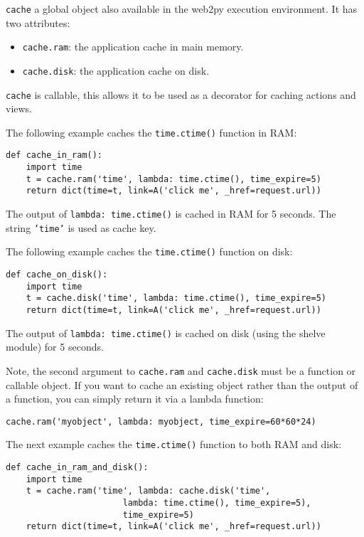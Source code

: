 \documentclass[justified,sixbynine,notoc]{tufte-book}
\def\ft{\small\tt}
\def\inxx#1{\index{#1}}
\begin{document}
\begin{fullwidth}
\inxx{cache} \inxx{cache.ram} \inxx{cache.disk}
{\ft cache} a global object also available in the web2py execution environment. It has two attributes:
\begin{itemize}
\item {\ft cache.ram}: the application cache in main memory.

\item {\ft cache.disk}: the application cache on disk.
\end{itemize}
{\ft cache} is callable, this allows it to be used as a decorator for caching actions and views.

The following example caches the {\ft time.ctime()} function in RAM:
\begin{lstlisting}
def cache_in_ram():
    import time
    t = cache.ram('time', lambda: time.ctime(), time_expire=5)
    return dict(time=t, link=A('click me', _href=request.url))
\end{lstlisting}

The output of {\ft lambda: time.ctime()} is cached in RAM for 5 seconds. The string {\ft 'time'} is used as cache key.

The following example caches the {\ft time.ctime()} function on disk:
\begin{lstlisting}
def cache_on_disk():
    import time
    t = cache.disk('time', lambda: time.ctime(), time_expire=5)
    return dict(time=t, link=A('click me', _href=request.url))
\end{lstlisting}

The output of {\ft lambda: time.ctime()} is cached on disk (using the shelve module) for 5 seconds.

Note, the second argument to {\ft cache.ram} and {\ft cache.disk} must be a function or callable object. If you want to cache an existing object rather than the output of a function, you can simply return it via a lambda function:
\begin{lstlisting}
cache.ram('myobject', lambda: myobject, time_expire=60*60*24)
\end{lstlisting}

The next example caches the {\ft time.ctime()} function to both RAM and disk:
\begin{lstlisting}
def cache_in_ram_and_disk():
    import time
    t = cache.ram('time', lambda: cache.disk('time',
                       lambda: time.ctime(), time_expire=5),
                       time_expire=5)
    return dict(time=t, link=A('click me', _href=request.url))
\end{lstlisting}


\end{fullwidth}
\end{document}
